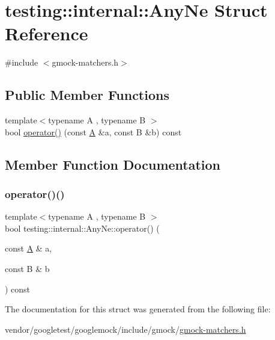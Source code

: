 \hypertarget{structtesting_1_1internal_1_1_any_ne}{}\section{testing\+:\+:internal\+:\+:Any\+Ne Struct Reference}
\label{structtesting_1_1internal_1_1_any_ne}


{\ttfamily \#include $<$gmock-\/matchers.\+h$>$}

\subsection*{Public Member Functions}
\begin{DoxyCompactItemize}
\item 
{\footnotesize template$<$typename A , typename B $>$ }\\bool \hyperlink{structtesting_1_1internal_1_1_any_ne_a9f50f8ede12e394c6bc64bad05e94742}{operator()} (const \hyperlink{namespacetesting_a5e9134d655d2fc9323902348083282e7}{A} \&a, const B \&b) const
\end{DoxyCompactItemize}


\subsection{Member Function Documentation}
\mbox{\label{structtesting_1_1internal_1_1_any_ne_a9f50f8ede12e394c6bc64bad05e94742}} 
\subsubsection{\texorpdfstring{operator()()}{operator()()}}
{\footnotesize\ttfamily template$<$typename A , typename B $>$ \\
bool testing\+::internal\+::\+Any\+Ne\+::operator() (\begin{DoxyParamCaption}\item[{const \hyperlink{namespacetesting_a5e9134d655d2fc9323902348083282e7}{A} \&}]{a,  }\item[{const B \&}]{b }\end{DoxyParamCaption}) const\hspace{0.3cm}{\ttfamily [inline]}}



The documentation for this struct was generated from the following file\+:\begin{DoxyCompactItemize}
\item 
vendor/googletest/googlemock/include/gmock/\hyperlink{gmock-matchers_8h}{gmock-\/matchers.\+h}\end{DoxyCompactItemize}
